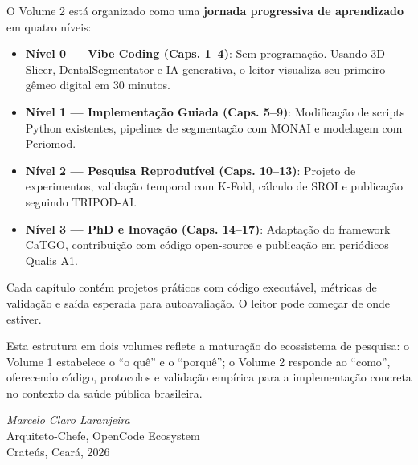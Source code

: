 \noindent O Volume 2 está organizado como uma \textbf{jornada progressiva de aprendizado} em quatro níveis:

\begin{itemize}
    \item \textbf{Nível 0 --- Vibe Coding (Caps. 1--4)}: Sem programação. Usando 3D Slicer, DentalSegmentator e IA generativa, o leitor visualiza seu primeiro gêmeo digital em 30 minutos.
    \item \textbf{Nível 1 --- Implementação Guiada (Caps. 5--9)}: Modificação de scripts Python existentes, pipelines de segmentação com MONAI e modelagem com Periomod.
    \item \textbf{Nível 2 --- Pesquisa Reprodutível (Caps. 10--13)}: Projeto de experimentos, validação temporal com K-Fold, cálculo de SROI e publicação seguindo TRIPOD-AI.
    \item \textbf{Nível 3 --- PhD e Inovação (Caps. 14--17)}: Adaptação do framework CaTGO, contribuição com código open-source e publicação em periódicos Qualis A1.
\end{itemize}

\vspace{0.5cm}

\noindent Cada capítulo contém projetos práticos com código executável, métricas de validação e saída esperada para autoavaliação. O leitor pode começar de onde estiver.

\vspace{0.5cm}

\noindent Esta estrutura em dois volumes reflete a maturação do ecossistema de pesquisa: o Volume 1 estabelece o ``o quê'' e o ``porquê''; o Volume 2 responde ao ``como'', oferecendo código, protocolos e validação empírica para a implementação concreta no contexto da saúde pública brasileira.

\vspace{1cm}

\begin{flushright}
\textit{Marcelo Claro Laranjeira}\\
Arquiteto-Chefe, OpenCode Ecosystem\\
Crateús, Ceará, 2026
\end{flushright}
